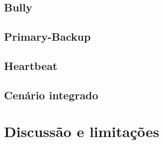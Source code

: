 \subsection{Bully}

\subsection{Primary-Backup}

\subsection{Heartbeat}

\subsection{Cenário integrado}

\section{Discussão e limitações}


